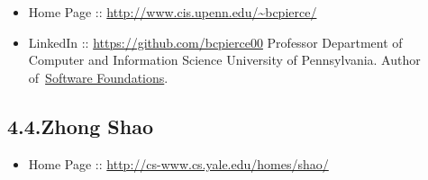\documentclass[12pt,twoside]{article}
\begin{document}
\begin{itemize}[noitemsep,topsep=\mdcompacttopsep]%

\item{}Home Page :: \href{http://www.cis.upenn.edu/~bcpierce/}{{\ttfamily http://\hspace{0pt}www.\hspace{0pt}cis.\hspace{0pt}upenn.\hspace{0pt}edu/\hspace{0pt}\textasciitilde{}bcpierce/\hspace{0pt}}}%

\item{}LinkedIn :: \href{https://github.com/bcpierce00}{{\ttfamily https://\hspace{0pt}github.\hspace{0pt}com/\hspace{0pt}bcpierce00}}
Professor Department of Computer and Information Science University of Pennsylvania.
Author of~\href{http://www.cis.upenn.edu/~bcpierce/sf}{Software Foundations}.%
\end{itemize}%

\subsection{4.4.\hspace*{0.5em}Zhong Shao}\label{sec-zhong-shao}%

\begin{itemize}[noitemsep,topsep=\mdcompacttopsep]%

\item{}Home Page :: \href{http://cs-www.cs.yale.edu/homes/shao/}{{\ttfamily http://\hspace{0pt}cs-\hspace{0pt}www.\hspace{0pt}cs.\hspace{0pt}yale.\hspace{0pt}edu/\hspace{0pt}homes/\hspace{0pt}shao/\hspace{0pt}}}%
\end{itemize}%
\end{document}
